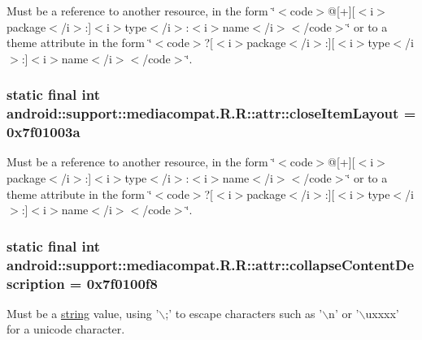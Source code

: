 Must be a reference to another resource, in the form \char`\"{}$<$code$>$@\mbox{[}+\mbox{]}\mbox{[}$<$i$>$package$<$/i$>$:\mbox{]}$<$i$>$type$<$/i$>$:$<$i$>$name$<$/i$>$$<$/code$>$\char`\"{} or to a theme attribute in the form \char`\"{}$<$code$>$?\mbox{[}$<$i$>$package$<$/i$>$:\mbox{]}\mbox{[}$<$i$>$type$<$/i$>$:\mbox{]}$<$i$>$name$<$/i$>$$<$/code$>$\char`\"{}. \hypertarget{classandroid_1_1support_1_1mediacompat_1_1_r_1_1attr_cc8249671bb67dabb41aa2a0287013fd}{
\subsubsection[{closeItemLayout}]{\setlength{\rightskip}{0pt plus 5cm}static final int android::support::mediacompat.R.R::attr::closeItemLayout = 0x7f01003a}}
\label{classandroid_1_1support_1_1mediacompat_1_1_r_1_1attr_cc8249671bb67dabb41aa2a0287013fd}


Must be a reference to another resource, in the form \char`\"{}$<$code$>$@\mbox{[}+\mbox{]}\mbox{[}$<$i$>$package$<$/i$>$:\mbox{]}$<$i$>$type$<$/i$>$:$<$i$>$name$<$/i$>$$<$/code$>$\char`\"{} or to a theme attribute in the form \char`\"{}$<$code$>$?\mbox{[}$<$i$>$package$<$/i$>$:\mbox{]}\mbox{[}$<$i$>$type$<$/i$>$:\mbox{]}$<$i$>$name$<$/i$>$$<$/code$>$\char`\"{}. \hypertarget{classandroid_1_1support_1_1mediacompat_1_1_r_1_1attr_6932b79f10df70f9a4a657051e859dbc}{
\subsubsection[{collapseContentDescription}]{\setlength{\rightskip}{0pt plus 5cm}static final int android::support::mediacompat.R.R::attr::collapseContentDescription = 0x7f0100f8}}
\label{classandroid_1_1support_1_1mediacompat_1_1_r_1_1attr_6932b79f10df70f9a4a657051e859dbc}


Must be a \hyperlink{classandroid_1_1support_1_1mediacompat_1_1_r_1_1string}{string} value, using '$\backslash$;' to escape characters such as '$\backslash$n' or '$\backslash$uxxxx' for a unicode character. 

